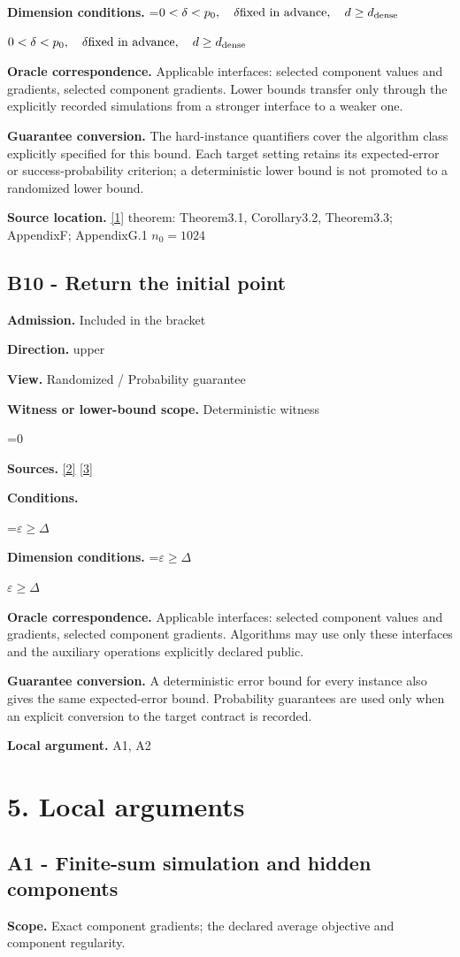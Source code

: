 \documentclass[10pt,a4paper]{article}
\newcommand{\AtlasMath}[1]{\par\begingroup\centering\setbox0=\hbox{$\displaystyle #1$}\ifdim\wd0>1.4\linewidth\typeout{ATLAS WIDE FORMULA: \the\wd0}\fi\ifdim\wd0>\linewidth\resizebox{\linewidth}{!}{\box0}\else\box0\fi\par\endgroup}
\newcommand{\AtlasInlineMath}[1]{\begingroup\setbox0=\hbox{$#1$}\ifdim\wd0>.4\linewidth\endgroup\AtlasMath{#1}\else\endgroup$#1$\fi}
\begin{document}
\textbf{Dimension conditions.} \AtlasInlineMath{0<\delta<p_0,\quad\delta\text{fixed in advance},\quad d\ge d_{\rm dense}}

\textbf{Oracle correspondence.} Applicable interfaces: selected component values and gradients, selected component gradients. Lower bounds transfer only through the explicitly recorded simulations from a stronger interface to a weaker one.

\textbf{Guarantee conversion.} The hard-instance quantifiers cover the algorithm class explicitly specified for this bound. Each target setting retains its expected-error or success-probability criterion; a deterministic lower bound is not promoted to a randomized lower bound.

\textbf{Source location.} \href{https://arxiv.org/pdf/2609.00045v3}{[1]} theorem: Theorem3.1, Corollary3.2, Theorem3.3; AppendixF; AppendixG.1 $n_0=1024$

\subsection{B10 - Return the initial point}
\textbf{Admission.} Included in the bracket

\textbf{Direction.} upper

\textbf{View.} Randomized / Probability guarantee

\textbf{Witness or lower-bound scope.} Deterministic witness

\AtlasMath{0}
\textbf{Sources.} \href{https://proceedings.mlr.press/v97/zhou19b/zhou19b.pdf}{[2]} \href{https://arxiv.org/pdf/1405.4980}{[3]}

\textbf{Conditions.} 
\AtlasMath{\varepsilon\ge\Delta}


\textbf{Dimension conditions.} \AtlasInlineMath{\varepsilon\ge\Delta}

\textbf{Oracle correspondence.} Applicable interfaces: selected component values and gradients, selected component gradients. Algorithms may use only these interfaces and the auxiliary operations explicitly declared public.

\textbf{Guarantee conversion.} A deterministic error bound for every instance also gives the same expected-error bound. Probability guarantees are used only when an explicit conversion to the target contract is recorded.

\textbf{Local argument.} A1, A2

\section{5. Local arguments}
\subsection{A1 - Finite-sum simulation and hidden components}
\textbf{Scope.} Exact component gradients; the declared average objective and component regularity.
\end{document}
